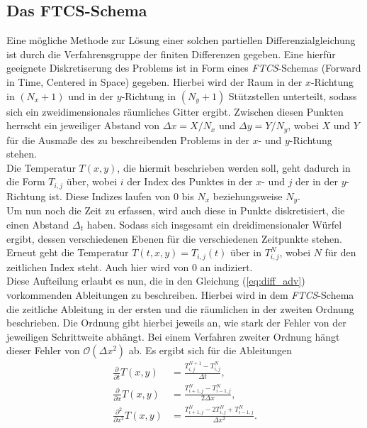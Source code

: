 \documentclass[12pt,a4paper,titlepage,headinclude,bibtotoc]{scrartcl}
\begin{document}
\subsection{Das FTCS-Schema}
\label{sec:ftcs}
Eine mögliche Methode zur Lösung einer solchen partiellen Differenzialgleichung ist durch die Verfahrensgruppe der finiten Differenzen gegeben. Eine hierfür geeignete Diskretiserung des Problems ist in Form eines \textit{FTCS}-Schemas (Forward in Time, Centered in Space) gegeben. Hierbei wird der Raum in der $x$-Richtung in $(N_x+1)$ und in der $y$-Richtung in $(N_y+1)$ Stützstellen unterteilt, sodass sich ein zweidimensionales räumliches Gitter ergibt. Zwischen diesen Punkten herrscht ein jeweiliger Abstand von $\Delta x = X/N_x$ und $\Delta y = Y/N_y$, wobei $X$ und $Y$ für die Ausmaße des zu beschreibenden Problems in der $x$- und $y$-Richtung stehen.\\
Die Temperatur $T(x, y)$, die hiermit beschrieben werden soll, geht dadurch in die Form $T_{i,j}$ über, wobei $i$ der Index des Punktes in der $x$- und $j$ der in der $y$-Richtung ist. Diese Indizes laufen von $0$ bis $N_x$ beziehungsweise $N_y$.\\
Um nun noch die Zeit zu erfassen, wird auch diese in Punkte diskretisiert, die einen Abstand $\Delta_t$ haben. Sodass sich insgesamt ein dreidimensionaler Würfel ergibt, dessen verschiedenen Ebenen für die verschiedenen Zeitpunkte stehen. Erneut geht die Temperatur $T(t, x, y) = T_{i,j}(t)$ über in $T_{i,j}^N$, wobei $N$ für den zeitlichen Index steht. Auch hier wird von $0$ an indiziert.\\

Diese Aufteilung erlaubt es nun, die in den Gleichung (\ref{eq:diff_adv}) vorkommenden Ableitungen zu beschreiben.   
Hierbei wird in dem \textit{FTCS}-Schema die zeitliche Ableitung in der ersten und die räumlichen in der zweiten Ordnung beschrieben. Die Ordnung gibt hierbei jeweils an, wie stark der Fehler von der jeweiligen Schrittweite abhängt. Bei einem Verfahren zweiter Ordnung hängt dieser Fehler von $\mathcal{O}(\Delta x^2)$ ab.
Es ergibt sich für die Ableitungen
\begin{align}
\frac{\partial}{\partial t}T(x,y) &= \frac{T_{i,j}^{N+1} - T_{i,j}^{N}}{\Delta t}, \\
\frac{\partial}{\partial x}T(x,y) &= \frac{T_{i+1,j}^{N} - T_{i-1,j}^{N}}{2 \Delta x}, \\
\frac{\partial^2}{\partial x^2}T(x,y) &= \frac{T_{i+1,j}^{N} - 2 T_{i,j}^{N} + T_{i-1,j}^{N}}{ \Delta x^2}.
\end{align}
\end{document}
